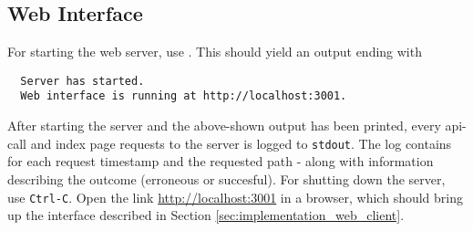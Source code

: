 \subsection{Web Interface}

For starting the web server, use . This should yield an output ending with
\begin{lstlisting}
  Server has started.
  Web interface is running at http://localhost:3001.
\end{lstlisting}

\noindent
After starting the server and the above-shown output has been printed, every api-call and index page requests to the server is logged to \texttt{stdout}.
The log contains for each request timestamp and the requested path - along with information describing the outcome (erroneous or succesful).
For shutting down the server, use \texttt{Ctrl-C}.
Open the link \url{http://localhost:3001} in a browser, which should bring up the interface described in Section \ref{sec:implementation_web_client}.\\

